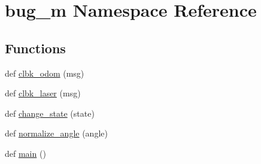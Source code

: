 \hypertarget{namespacebug__m}{}\section{bug\+\_\+m Namespace Reference}
\label{namespacebug__m}
\subsection*{Functions}
\begin{DoxyCompactItemize}
\item 
def \hyperlink{namespacebug__m_a27cfd2a326148157d3e5e0affbe763f3}{clbk\+\_\+odom} (msg)
\item 
def \hyperlink{namespacebug__m_a6ab3d92b5b6ea12eaa52bf21cfa111f1}{clbk\+\_\+laser} (msg)
\item 
def \hyperlink{namespacebug__m_aca19305feae5c5489e7452e921fcbd9c}{change\+\_\+state} (state)
\item 
def \hyperlink{namespacebug__m_a6547c5ebcd1d3aa3e104a5b573e47862}{normalize\+\_\+angle} (angle)
\item 
def \hyperlink{namespacebug__m_a357589ad533151302b9fa9a893833382}{main} ()
\end{DoxyCompactItemize}
